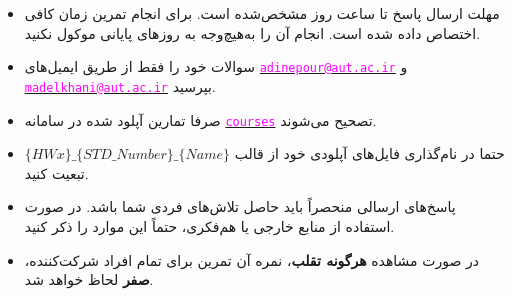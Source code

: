 \begin{itemize}
	\small
	\setlength\itemsep{0.05em}
	\item
	مهلت ارسال پاسخ تا ساعت  روز مشخص‌شده است. ﺑﺮای اﻧﺠﺎم ﺗﻤﺮﯾﻦ زﻣﺎن کافی اختصاص‌ داده ‌شده اﺳﺖ. انجام آن را به‌هیچ‌وجه ﺑﻪ روزﻫﺎی پایانی موکول نکنید.
	\item 
	سوالات خود را فقط از طریق ایمیل‌های \href{mailto:adinepour@aut.ac.ir}{\textcolor{magenta}{\texttt{adinepour@aut.ac.ir}}} و \href{mailto:madelkhani@aut.ac.ir}{\textcolor{magenta} {\texttt{madelkhani@aut.ac.ir}}} بپرسید.
	\item 
	صرفا تمارین آپلود شده در سامانه \href{https://courses.aut.ac.ir/}{\textcolor{magenta}{\texttt{courses}}} تصحیح می‌شوند.
	
	\item 
	حتما در نام‌گذاری فایل‌های آپلودی خود از قالب
	$\{HWx\}\_\{STD\_Number\}\_\{Name\}$ 
	تبعیت کنید.
	
	\item
	پاسخ‌های ارسالی منحصراً باید حاصل تلاش‌های فردی شما باشد. در صورت استفاده از منابع خارجی یا هم‌فکری، حتماً این موارد را ذکر کنید.
	
	\item 
	در صورت مشاهده \textbf{هرگونه تقلب}، نمره آن تمرین برای تمام افراد شرکت‌کننده، \textbf{صفر} لحاظ خواهد شد.
\end{itemize}